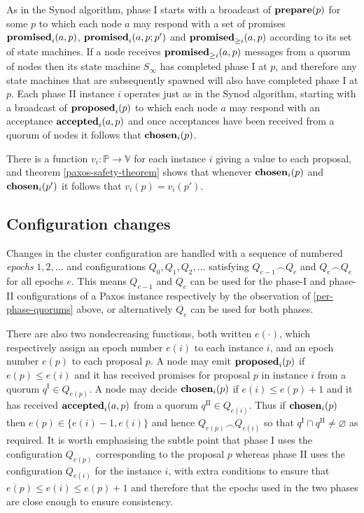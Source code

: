\documentclass[journal]{IEEEtran}
\begin{document}
As in the Synod algorithm, phase I starts with a broadcast of $\mathbf{prepare}(p)$ for
some $p$ to which each node $a$ may respond with a set of promises
$\mathbf{promised}_{i}(a,p)$, $\mathbf{promised}_{i}(a,p;p')$ and $\mathbf{promised}_{\ge i}(a,p)$ according to its
set of state machines. If a node receives $\mathbf{promised}_{\ge i}(a,p)$ messages from a
quorum of nodes then its state machine $S_\infty$ has completed phase I at $p$,
and therefore any state machines that are subsequently spawned will also have
completed phase I at $p$. Each phase II instance $i$ operates just as in the
Synod algorithm, starting with a broadcast of $\mathbf{proposed}_{i}(p)$ to which each node
$a$ may respond with an acceptance $\mathbf{accepted}_{i}(a,p)$ and once acceptances have
been received from a quorum of nodes it follows that $\mathbf{chosen}_{i}(p)$.

There is a function $v_i : \mathbb P \to \mathbb V$ for each instance $i$
giving a value to each proposal, and theorem \ref{paxos-safety-theorem} shows
that whenever $\mathbf{chosen}_{i}(p)$ and $\mathbf{chosen}_{i}(p')$ it follows that $v_i(p) =
v_i(p')$.

\subsection{Configuration changes}\label{configuration-changes}

Changes in the cluster configuration are handled with a sequence of numbered
\textit{epochs} $1, 2, \ldots$ and configurations $Q_0, Q_1, Q_2, \ldots$
satisfying $Q_{e-1} \frown Q_e$ and $Q_e \frown Q_e$ for all epochs $e$.  This
means $Q_{e-1}$ and $Q_e$ can be used for the phase-I and phase-II
configurations of a Paxos instance respectively by the observation of
\ref{per-phase-quorums} above, or alternatively $Q_e$ can be used for both
phases.

There are also two nondecreasing functions, both written $e(\cdot)$, which
respectively assign an epoch number $e(i)$ to each instance $i$, and an epoch
number $e(p)$ to each proposal $p$. A node may emit $\mathbf{proposed}_{i}(p)$ if $e(p) \le
e(i)$ and it has received promises for proposal $p$ in instance $i$ from a
quorum $q^\textrm{I} \in Q_{e(p)}$. A node may decide $\mathbf{chosen}_{i}(p)$ if ${e(i)
\le e(p)+1}$ and it has received $\mathbf{accepted}_{i}(a,p)$ from a quorum ${q^\textrm{II}
\in Q_{e(i)}}$. Thus if $\mathbf{chosen}_{i}(p)$ then ${e(p) \in \{ e(i)-1, e(i) \}}$
and hence $Q_{e(p)} \frown Q_{e(i)}$ so that $q^\textrm{I} \cap q^\textrm{II}
\ne \varnothing$ as required. It is worth emphasising the subtle point that
phase I uses the configuration $Q_{e(p)}$ corresponding to the proposal $p$
whereas phase II uses the configuration $Q_{e(i)}$ for the instance $i$, with
extra conditions to ensure that $e(p) \le e(i) \le e(p) + 1$ and therefore that
the epochs used in the two phases are close enough to ensure consistency.
\end{document}
